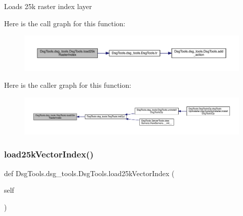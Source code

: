 \begin{DoxyVerb}Loads 25k raster index layer
\end{DoxyVerb}
 Here is the call graph for this function\+:
\nopagebreak
\begin{figure}[H]
\begin{center}
\leavevmode
\includegraphics[width=350pt]{class_dsg_tools_1_1dsg__tools_1_1_dsg_tools_a3fbcb16c1fa37133d89a1f916f254958_cgraph}
\end{center}
\end{figure}
Here is the caller graph for this function\+:
\nopagebreak
\begin{figure}[H]
\begin{center}
\leavevmode
\includegraphics[width=350pt]{class_dsg_tools_1_1dsg__tools_1_1_dsg_tools_a3fbcb16c1fa37133d89a1f916f254958_icgraph}
\end{center}
\end{figure}
\mbox{\label{class_dsg_tools_1_1dsg__tools_1_1_dsg_tools_a678ff479d9d170618893e864a6cfecbf}} 
\subsubsection{\texorpdfstring{load25k\+Vector\+Index()}{load25kVectorIndex()}}
{\footnotesize\ttfamily def Dsg\+Tools.\+dsg\+\_\+tools.\+Dsg\+Tools.\+load25k\+Vector\+Index (\begin{DoxyParamCaption}\item[{}]{self }\end{DoxyParamCaption})}

